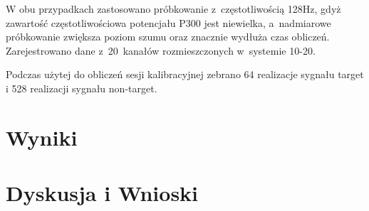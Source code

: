 \documentclass[licencjacka,openright]{pracamgr}
\begin{document}
W obu przypadkach zastosowano próbkowanie z~częstotliwością 128Hz, gdyż zawartość częstotliwościowa potencjału P300 jest niewielka, a~nadmiarowe próbkowanie zwiększa poziom szumu oraz znacznie wydłuża czas obliczeń. Zarejestrowano dane z~20~kanałów rozmieszczonych w~systemie 10-20.

Podczas użytej do obliczeń sesji kalibracyjnej zebrano 64 realizacje sygnału target i 528 realizacji sygnału non-target.

\chapter{Wyniki}



\chapter{Dyskusja i Wnioski}



\end{document}
